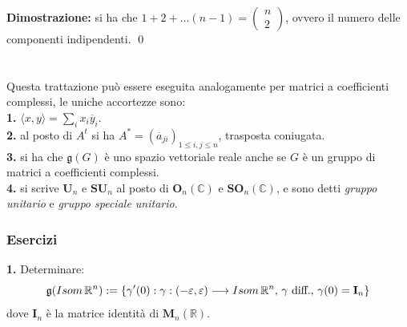 \documentclass{article}
\begin{document}
\textbf{Dimostrazione:} si ha che $1 + 2 + \dots (n - 1) = \begin{pmatrix}
    n \\
    2
\end{pmatrix}$, ovvero il numero delle componenti indipendenti. \qed \\ \\ \\
Questa trattazione può essere eseguita analogamente per matrici a coefficienti complessi, le uniche accortezze sono: \\
\textbf{1.} $\langle x, y \rangle = \sum_i x_i \overline{y}_i$. \\
\textbf{2.} al posto di $A^t$ si ha $A^* = (\overline{a}_{ji})_{1 \leq i, j \leq n}$, trasposta coniugata. \\
\textbf{3.} si ha che $\mathfrak{g}(G)$ è uno spazio vettoriale reale anche se $G$ è un gruppo di matrici a coefficienti complessi. \\
\textbf{4.} si scrive $\mathbf{U}_n$ e $\mathbf{SU}_n$ al posto di $\mathbf{O}_n(\mathbb{C})$ e $\mathbf{SO}_n(\mathbb{C})$, e sono detti \textit{gruppo unitario} e \textit{gruppo speciale unitario}.

\subsubsection{Esercizi}
\textbf{1.} Determinare: 
\begin{equation}
    \mathfrak{g}(Isom\, \mathbb{R}^n) := \{ \gamma ' (0) : \gamma : (- \varepsilon, \varepsilon) \longrightarrow Isom\, \mathbb{R}^n, \, \gamma \text{ diff.}, \, \gamma(0) = \mathbf{I}_n \} \notag
\end{equation} 
dove $\mathbf{I}_n$ è la matrice identità di $\mathbf{M}_n(\mathbb{R})$. \\
\end{document}

